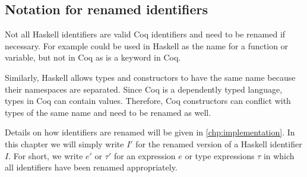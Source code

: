 \subsection{Notation for renamed identifiers}
Not all Haskell identifiers are valid Coq identifiers and need to be renamed if necessary.
For example  could be used in Haskell as the name for a function or variable, but not in Coq as  is a keyword in Coq.

Similarly, Haskell allows types and constructors to have the same name because their namespaces are separated.
Since Coq is a dependently typed language, types in Coq can contain values.
Therefore, Coq constructors can conflict with types of the same name and need to be renamed as well.

Details on how identifiers are renamed will be given in \autoref{chp:implementation}.
In this chapter we will simply write $I'$ for the renamed version of a Haskell identifier $I$.
For short, we write $e'$ or $\tau'$ for an expression $e$ or type expressions $\tau$ in which all identifiers have been renamed appropriately.
